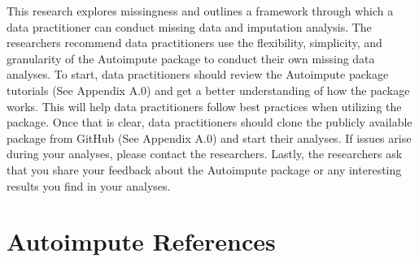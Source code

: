 \documentclass[12pt,oneside]{chicagocapstone}
\begin{document}
This research explores missingness and outlines a framework through
which a data practitioner can conduct missing data and imputation
analysis. The researchers recommend data practitioners use the
flexibility, simplicity, and granularity of the Autoimpute package to
conduct their own missing data analyses. To start, data practitioners
should review the Autoimpute package tutorials (See Appendix A.0) and
get a better understanding of how the package works. This will help data
practitioners follow best practices when utilizing the package. Once
that is clear, data practitioners should clone the publicly available
package from GitHub (See Appendix A.0) and start their analyses. If
issues arise during your analyses, please contact the researchers.
Lastly, the researchers ask that you share your feedback about the
Autoimpute package or any interesting results you find in your analyses.

\appendix

\chapter{Autoimpute References}\label{autoimpute-references}
\end{document}

